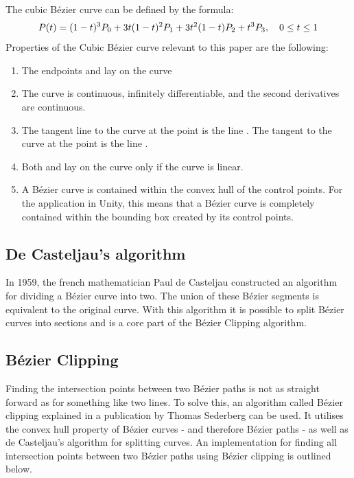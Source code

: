     
        The cubic Bézier curve can be defined by the formula\cite{Cubic-Bézier-Curves}: 
        $$
            P(t) = (1-t)^3P_0 + 3t(1 - t)^2P_1 + 3t^2(1 - t)P_2 + t^3P_3 , \quad 0 \le t \le 1
        $$
        Properties of the Cubic Bézier curve relevant to this paper are the following:
        \begin{enumerate}
            \item The endpoints  and  lay on the curve
            \item The curve is continuous, infinitely differentiable, and the second derivatives are continuous.
            \item The tangent line to the curve at the point  is the line . The tangent to the
        curve at the point  is the line .
            \item Both  and  lay on the curve only if the curve is linear.
            \item A Bézier curve is contained within the convex hull of the control points. For the application in Unity, this means that a Bézier curve is completely contained within the bounding box created by its control points.
        \end{enumerate}


    \subsection{De Casteljau's algorithm}
        In 1959, the french mathematician Paul de Casteljau constructed an algorithm for dividing a Bézier curve into two. The union of these Bézier segments is equivalent to the original curve. With this algorithm it is possible to split Bézier curves into sections and is a core part of the Bézier Clipping algorithm.
    
    \subsection{Bézier Clipping}\label{bezier-clipping}
        Finding the intersection points between two Bézier paths is not as straight forward as for something like two lines. To solve this, an algorithm called Bézier clipping explained in a publication by Thomas Sederberg can be used\cite{bezier-clipping}. It utilises the convex hull property of Bézier curves - and therefore Bézier paths - as well as de Casteljau's algorithm for splitting curves. An implementation for finding all intersection points between two Bézier paths using Bézier clipping is outlined below.

